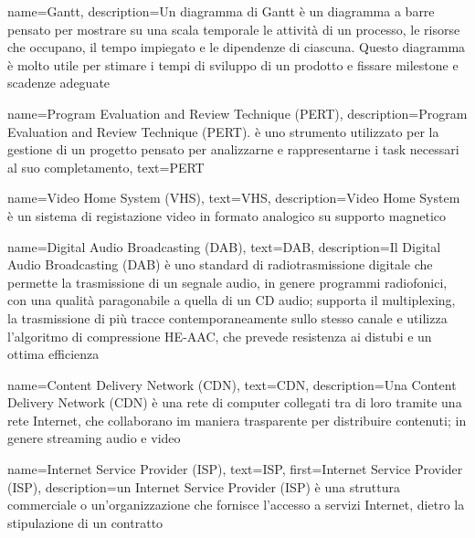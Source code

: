 {
    name={Gantt},
    description={Un diagramma di Gantt è un diagramma a barre pensato per mostrare su una scala temporale le attività di un processo, le risorse che occupano, il tempo impiegato e le dipendenze di ciascuna. Questo diagramma è molto utile per stimare i tempi di sviluppo di un prodotto e fissare milestone e scadenze adeguate}
}

{
    name={Program Evaluation and Review Technique (PERT)},
    description={Program Evaluation and Review Technique (PERT). è uno strumento utilizzato per la gestione di un progetto pensato per analizzarne e rappresentarne i task necessari al suo completamento},
    text={PERT}
}

{
    name={Video Home System (VHS)},
    text={VHS},
    description={Video Home System è un sistema di registazione video in formato analogico su supporto magnetico}
}

{
    name={Digital Audio Broadcasting (DAB)},
    text={DAB},
    description={Il Digital Audio Broadcasting (DAB) è uno standard di radiotrasmissione digitale che permette la trasmissione di un segnale audio, in genere programmi radiofonici, con una qualità paragonabile a quella di un CD audio; supporta il multiplexing, la trasmissione di più tracce contemporaneamente sullo stesso canale e utilizza l'algoritmo di compressione HE-AAC, che prevede resistenza ai distubi e un ottima efficienza}
}

{
    name={Content Delivery Network (CDN)},
    text={CDN},
    description={Una Content Delivery Network (CDN) è una rete di computer collegati tra di loro tramite una rete Internet, che collaborano im maniera trasparente per distribuire contenuti; in genere streaming audio e video}
}

{
    name={Internet Service Provider (ISP)},
    text={ISP},
    first={Internet Service Provider (ISP)},
    description={un Internet Service Provider (ISP) è una struttura commerciale o un'organizzazione che fornisce l'accesso a servizi Internet, dietro la stipulazione di un contratto}
}